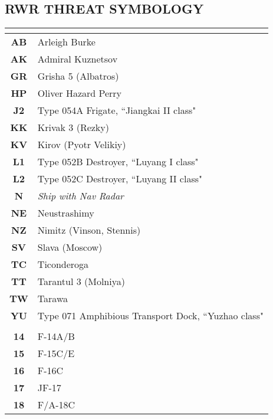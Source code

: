 \documentclass[8pt,usenames,dvipsnames,twoside]{article}
\begin{document}
		\subsection{RWR THREAT SYMBOLOGY}
		\begin{multicols*}{2}
		\begin{center}
			\begin{tabular}{c | p{4cm} }
				\toprule
				\multicolumn{2}{c}{\blue{SHIPS}} \\
				\toprule
				\textbf{AB} & Arleigh Burke \\
				\midrule
				\textbf{AK} & Admiral Kuznetsov \\
				\midrule
				\textbf{GR} & Grisha 5 (Albatros) \\
				\midrule
				\textbf{HP} & Oliver Hazard Perry \\
				\midrule
				\textbf{J2} & Type 054A Frigate, ``Jiangkai II class" \\
				\midrule
				\textbf{KK} & Krivak 3 (Rezky) \\
				\midrule
				\textbf{KV} & Kirov (Pyotr Velikiy) \\
				\midrule
				\textbf{L1} & Type 052B Destroyer, ``Luyang I class" \\
				\midrule
				\textbf{L2} & Type 052C Destroyer, ``Luyang II class" \\
				\midrule
				\textbf{N} & \emph{Ship with Nav Radar} \\
				\midrule
				\textbf{NE} & Neustrashimy \\
				\midrule
				\textbf{NZ} & Nimitz (Vinson, Stennis) \\
				\midrule
				\textbf{SV} & Slava (Moscow) \\
				\midrule
				\textbf{TC} & Ticonderoga \\
				\midrule
				\textbf{TT} & Tarantul 3 (Molniya) \\
				\midrule
				\textbf{TW} & Tarawa \\
				\midrule
				\textbf{YU} & Type 071 Amphibious Transport Dock, ``Yuzhao class" \\
				\midrule
				\multicolumn{2}{c}{\blue{AIRCRAFT}} \\
				\toprule
				\textbf{14} & F-14A/B \\
				\midrule
				\textbf{15} & F-15C/E \\
				\midrule
				\textbf{16} & F-16C \\
				\midrule
				\textbf{17} & JF-17 \\
				\midrule
				\textbf{18} & F/A-18C \\

\end{tabular}
\end{center}
\end{multicols*}
\end{document}
